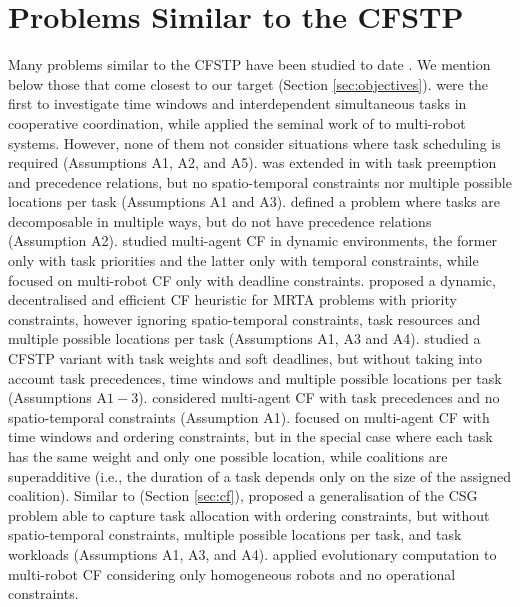 \section{Problems Similar to the CFSTP}\label{chap2:limitations}

Many problems similar to the CFSTP have been studied to date
\cite{rizk2019survey,dadvar2021,murphy2016a,murphy2016b,paraskevopoulos2017,seenu2020survey,queralta2020survey,rizk2019survey,juarez2021}.
We mention below those that come closest to our target (Section \ref{sec:objectives}).
\cite{scerri2005} were the first to investigate time windows and interdependent
simultaneous tasks in cooperative coordination, while \cite{vig2006,service2011} applied
the seminal work of \cite{shehory1998} to multi-robot systems. However, none of them not
consider situations where task scheduling is required (Assumptions A1, A2, and A5).
\cite{vig2006} was extended in \cite{vig2007} with task preemption and precedence
relations, but no spatio-temporal constraints nor multiple possible locations per task
(Assumptions A1 and A3). \cite{zlot2006thesis} defined a problem where tasks are
decomposable in multiple ways, but do not have precedence relations (Assumption A2).
\cite{singh2014,su2018} studied multi-agent CF in dynamic environments, the former only
with task priorities and the latter only with temporal constraints, while \cite{luo2015}
focused on multi-robot CF only with deadline constraints. \cite{ayari2017} proposed a
dynamic, decentralised and efficient CF heuristic for MRTA problems with priority
constraints, however ignoring spatio-temporal constraints, task resources and
multiple possible locations per task (Assumptions A1, A3 and A4).
\cite{nelke2020,tkach2021} studied a CFSTP variant with task weights and soft deadlines,
but without taking into account task precedences, time windows and multiple possible
locations per task (Assumptions A$1 - 3$). \cite{bischoff2020} considered multi-agent CF
with task precedences and no spatio-temporal constraints (Assumption A1).
\cite{suslova2020} focused on multi-agent CF with time windows and ordering constraints,
but in the special case where each task has the same weight and only one possible
location, while coalitions are superadditive (i.e., the duration of a task depends only on
the size of the assigned coalition). Similar to \cite{krausburg2021} (Section
\ref{sec:cf}), \cite{prantare2020,prantare2021} proposed a generalisation of the CSG
problem able to capture task allocation with ordering constraints, but without
spatio-temporal constraints, multiple possible locations per task, and task workloads
(Assumptions A1, A3, and A4). \cite{arif2021} applied evolutionary computation to
multi-robot CF considering only homogeneous robots and no operational constraints.

